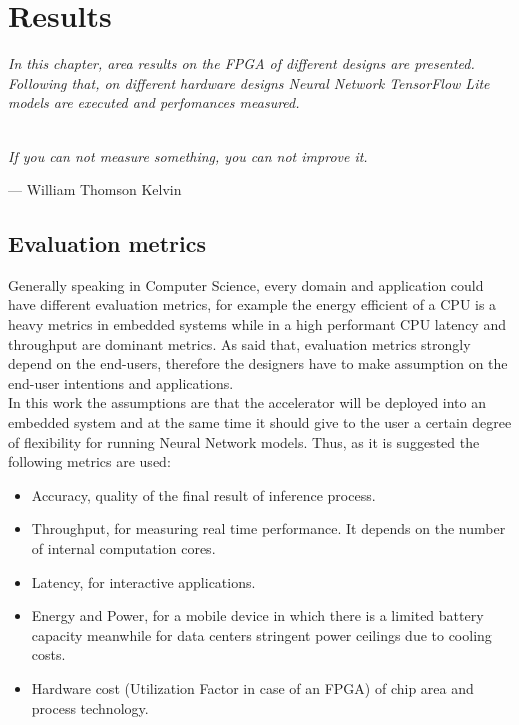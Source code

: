 \chapter{Results}
\textit{In this chapter, area results on the FPGA of different designs are presented. Following that, on different hardware designs Neural Network TensorFlow Lite models are executed and perfomances measured. }\\\\

\epigraph{ \textit{If you can not measure something, you can not improve it.}}{--- \textup{William Thomson Kelvin}}

\section{Evaluation metrics}
Generally speaking in Computer Science, every domain and application could have different evaluation metrics, for example the energy efficient of a CPU is a heavy metrics in embedded systems while in a high performant CPU latency and throughput are dominant metrics. As said that, evaluation metrics strongly depend on the end-users, therefore the designers have to make assumption on the end-user intentions and applications.\\
In this work the assumptions are that the accelerator will be deployed into an embedded system and at the same time it should give to the user a certain degree of flexibility for running Neural Network models. Thus, as it is suggested \cite{paper:1} the following metrics are used:
\begin{itemize}
\item Accuracy, quality of the final result of inference process.
\item Throughput, for measuring real time performance. It depends on the number of internal computation cores.
\item Latency, for interactive applications.
\item Energy and Power, for a mobile device in which there is a limited battery capacity meanwhile for data centers stringent power ceilings due to cooling costs.
\item Hardware cost (Utilization Factor in case of an FPGA) of chip area and process technology.
\end{itemize}
\newpage
